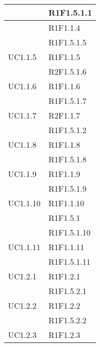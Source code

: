 \begin{longtable}{|>{\centering}m{5cm}|m{5cm}<{\centering}|}
&{R1F1.5.1.1}\\ \hline
{UC1.1.4}&{R1F1.1.4}\\
&{R1F1.5.1.5}\\ \hline
{UC1.1.5}&{R1F1.1.5}\\
&{R2F1.5.1.6}\\ \hline
{UC1.1.6}&{R1F1.1.6}\\
&{R1F1.5.1.7}\\ \hline
{UC1.1.7}&{R2F1.1.7}\\
&{R1F1.5.1.2}\\ \hline
{UC1.1.8}&{R1F1.1.8}\\
&{R1F1.5.1.8}\\ \hline
{UC1.1.9}&{R1F1.1.9}\\
&{R1F1.5.1.9}\\ \hline
{UC1.1.10}&{R1F1.1.10}\\
&{R1F1.5.1}\\
&{R1F1.5.1.10}\\ \hline
{UC1.1.11}&{R1F1.1.11}\\
&{R1F1.5.1.11}\\ \hline

{UC1.2.1}&{R1F1.2.1}\\
&{R1F1.5.2.1}\\ \hline
{UC1.2.2}&{R1F1.2.2}\\
&{R1F1.5.2.2}\\ \hline
{UC1.2.3}&{R1F1.2.3}\\ \hline


\end{longtable}
